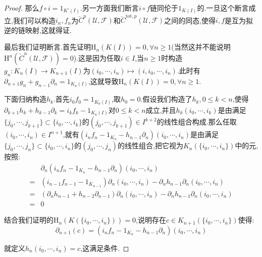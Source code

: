 \begin{enumerate}
\begin{proof}
		那么$f\circ i=1_{K'(I)}$.另一方面我们断言$i\circ f$链同伦于$1_{K(I)}$的.一旦这个断言成立,我们可以构造$i_n,f_n$为$\check{C}^p(\mathscr{U},\mathscr{F})$和$\check{C}^{\mathrm{tot},p}(\mathscr{U},\mathscr{F})$之间的同态,使得$i,f$是互为拟逆的链映射,这就得证.
		
		\qquad
		
		最后我们证明断言.首先证明$\mathrm{H}_n(K(I))=0,\forall n\ge1$(当然这并不能说明$\mathrm{H}^n(\check{C}^n(\mathscr{U},\mathscr{F}))=0$).这是因为任取$i\in I$,当$n\ge1$时构造$g_n:K_n(I)\to K_{n+1}(I)$为$(i_0,\cdots,i_n)\mapsto(i,i_0,\cdots,i_n)$.此时有$\partial_{n+1}g_n+g_{n-1}\partial_n=1_{K_n(I)}$,这就导致$\mathrm{H}_n(K(I))=0,\forall n\ge1$.
		
		\qquad
		
		下面归纳构造$h_k$.首先$i_0f_0=1_{K_0(I)}$,取$h_0=0$.假设我们构造了$h_k,0\le k<n$,使得$\partial_{k+1}h_k+h_{k-1}\partial_k=i_kf_k-1_{K_k(I)}$对$0\le k<n$成立,并且$h_k(i_0,\cdots,i_k)$是由满足$\{j_0,\cdots,j_{k+1}\}\subset\{i_0,\cdots,i_k\}$的$(j_0,\cdots,j_{k+1})\in I^{k+2}$的线性组合构成.那么任取$(i_0,\cdots,i_n)\in I^{n+1}$,就有$(i_nf_n-1_{K_n}-h_{n-1}\partial_n)(i_0,\cdots,i_n)$是由满足$\{j_0,\cdots,j_n\}\subset\{i_0,\cdots,i_n\}$的$(j_0,\cdots,j_n)$的线性组合,把它视为$K_n(\{i_0,\cdots,i_n\})$中的元,按照:
		\begin{align*}
			&\partial_n(i_nf_n-1_{K_n}-h_{n-1}\partial_n)(i_0,\cdots,i_n)\\=&(i_{n-1}f_{n-1}-1_{K_{n-1}})\partial_n(i_0,\cdots,i_n)-\partial_nh_{n-1}\partial_n(i_0,\cdots,i_n)\\=&(\partial_nh_{n-1}+h_{n-2}\partial_{n-1})\partial_n(i_0,\cdots,i_n)-\partial_nh_{n-1}\partial_n(i_0,\cdots,i_n)\\=&0
		\end{align*}
		
		结合我们证明的$\mathrm{H}_n(K(\{i_0,\cdots,i_n\}))=0$,说明存在$c\in K_{n+1}(\{i_0,\cdots,i_n\})$使得:
		$$\partial_{n+1}(c)=(i_nf_n-1_{K_n}-h_{n-1}\partial_n)(i_0,\cdots,i_n)$$
		
		就定义$h_n(i_0,\cdots,i_n)=c$,这满足条件.
	\end{proof}
\end{enumerate}

